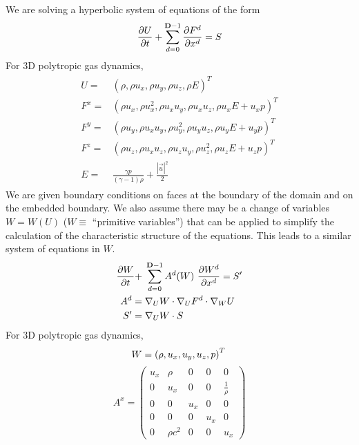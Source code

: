 We are solving a hyperbolic system of equations of the form
\begin{equation}
\frac{\partial U}{\partial t}
+ \sum\limits^{{\mathbf{D}}-1}_{d=0} \frac{\partial F^d}{\partial x^d}
= S
\end{equation}
For 3D polytropic gas dynamics, 
\begin{align}
\begin{split}
U     =& \left(\rho      , \rho u_x      , \rho u_y    , \rho u_z     , \rho E \right)^T \\
F^x   =& \left(\rho u_x  , \rho u^2_x    , \rho u_x u_y, \rho u_x u_z , \rho u_x E +u_x  p  \right)^T  \\
F^y   =& \left(\rho u_y  , \rho u_x u_y  , \rho u^2_y  , \rho u_y u_z , \rho u_y E +u_y  p  \right)^T  \\
F^z   =& \left(\rho u_z  , \rho u_x u_z  , \rho u_z u_y, \rho u^2_z   , \rho u_z E +u_z  p  \right)^T  \\
E     =&  \frac{\gamma p }{(\gamma -1) \rho} + \frac{|\vec u|^2}{2}  
\end{split}
\end{align}
We are given boundary
conditions on faces at the boundary of the domain and
on the embedded boundary.
We also assume there may be a change of variables $W = W(U)$ ($W \equiv
$ ``primitive variables'') that can be applied to simplify the
calculation of the characteristic structure of the equations.
This leads to a similar system of equations in $W$.
\begin{equation}
\begin{split}
\frac{\partial W}{\partial t}
+ & \; \sum\limits^{{\mathbf{D}}-1}_{d=0} A^d(W) ~ \frac{\partial W^d}{\partial x^d}
= S' \\
A^d = & \; \nabla_U W \cdot \nabla_U F^d \cdot \nabla_W U \\
S' = & \; \nabla_U W \cdot S
\end{split}
\end{equation}
For 3D polytropic gas dynamics, 
\begin{equation*}
W   = \left(\rho,  u_x, u_y, u_z , p \right)^T \\
\end{equation*}
\begin{equation*}
A^x = \left( \begin{array}{ccccc} 
 u_x       & \rho      & 0        &  0       & 0                \\
 0         & u_x       & 0        &  0       & \frac{1}{\rho}   \\
 0         & 0         & u_x      &  0       & 0                \\
 0         & 0         & 0        & u_x      & 0                \\
 0         & \rho c^2  & 0        &  0       &  u_x
\end{array}        \right)
\end{equation*}
